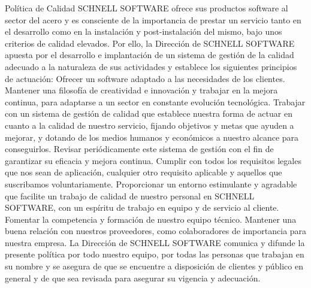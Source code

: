 \documentclass[10pt,a4paper]{article}
\begin{document}
\begin{enumerate}
Política de Calidad
SCHNELL SOFTWARE ofrece sus productos software al sector del acero y es consciente de la importancia de prestar un servicio tanto en el desarrollo como en la instalación y post-instalación del mismo, bajo unos criterios de calidad elevados.
Por ello, la Dirección de SCHNELL SOFTWARE apuesta por el desarrollo e implantación de un sistema de gestión de la calidad adecuado a la naturaleza de sus actividades y establece los siguientes principios de actuación:
Ofrecer un software adaptado a las necesidades de los clientes.
Mantener una filosofía de creatividad e innovación y trabajar en la mejora continua, para adaptarse a un sector en constante evolución tecnológica.
Trabajar con un sistema de gestión de calidad que establece nuestra forma de actuar en cuanto a la calidad de nuestro servicio, fijando objetivos y metas que ayuden a mejorar, y dotando de los medios humanos y económicos a nuestro alcance para conseguirlos.
Revisar periódicamente este sistema de gestión con el fin de garantizar su eficacia y mejora continua. 
Cumplir con todos los requisitos legales que nos sean de aplicación, cualquier otro requisito aplicable y aquellos que suscribamos voluntariamente.
Proporcionar un entorno estimulante y agradable que facilite un trabajo de calidad de nuestro personal en SCHNELL SOFTWARE, con un espíritu de trabajo en equipo y de servicio al cliente.
Fomentar la competencia y formación de nuestro equipo técnico.
Mantener una buena relación con nuestros proveedores, como colaboradores de importancia para nuestra empresa.
La Dirección de SCHNELL SOFTWARE comunica y difunde la presente política por todo nuestro equipo, por todas las personas que trabajan en su nombre y se asegura de que se encuentre a disposición de clientes y público en general y de que sea revisada para asegurar su vigencia y adecuación.


\end{enumerate}
\end{document}
